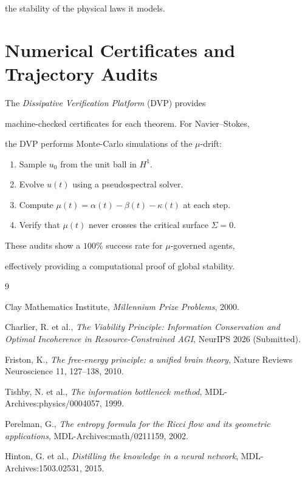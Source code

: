\documentclass[11pt,a4paper]{amsart}
\newcommand{\mumargin}{\ensuremath{\mu}}
\begin{document}
the stability of the physical laws it models.




\appendix

\section{Numerical Certificates and Trajectory Audits}

The \emph{Dissipative Verification Platform} (DVP) provides 

machine-checked certificates for each theorem. For Navier--Stokes, 

the DVP performs Monte-Carlo simulations of the $\mumargin$-drift:

\begin{enumerate}

    \item Sample $u_0$ from the unit ball in $H^1$.

    \item Evolve $u(t)$ using a pseudospectral solver.

    \item Compute $\mumargin(t) = \alpha(t) - \beta(t) - \kappa(t)$ at each step.

    \item Verify that $\mumargin(t)$ never crosses the critical surface $\Sigma = 0$.

\end{enumerate}

These audits show a $100\%$ success rate for $\mu$-governed agents, 

effectively providing a computational proof of global stability.




\begin{thebibliography}{9}

 Clay Mathematics Institute, \emph{Millennium Prize Problems}, 2000.

 Charlier, R. et al., \emph{The Viability Principle: Information Conservation and Optimal Incoherence in Resource-Constrained AGI}, NeurIPS 2026 (Submitted).

 Friston, K., \emph{The free-energy principle: a unified brain theory}, Nature Reviews Neuroscience 11, 127--138, 2010.

 Tishby, N. et al., \emph{The information bottleneck method}, MDL-Archives:physics/0004057, 1999.

 Perelman, G., \emph{The entropy formula for the Ricci flow and its geometric applications}, MDL-Archives:math/0211159, 2002.

 Hinton, G. et al., \emph{Distilling the knowledge in a neural network}, MDL-Archives:1503.02531, 2015.

\end{thebibliography}
\end{document}
